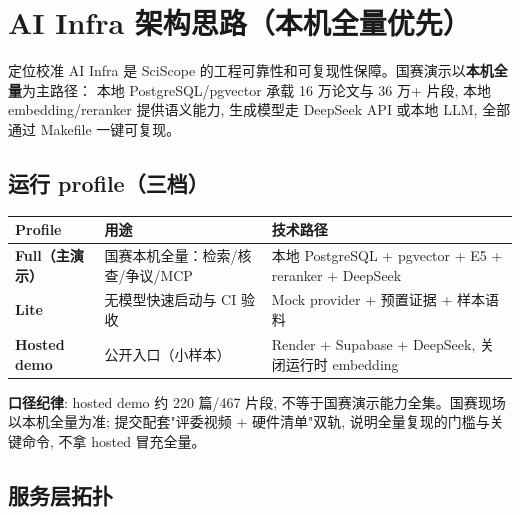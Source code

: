 \section{AI Infra 架构思路（本机全量优先）}

\begin{designbox}{定位校准}
AI Infra 是 SciScope 的工程可靠性和可复现性保障。国赛演示以\textbf{本机全量}为主路径：
本地 PostgreSQL/pgvector 承载 16 万论文与 36 万+ 片段, 本地 embedding/reranker 提供语义能力,
生成模型走 DeepSeek API 或本地 LLM, 全部通过 Makefile 一键可复现。
\end{designbox}

\subsection{运行 profile（三档）}

\begin{center}
\begin{tabularx}{\textwidth}{>{\bfseries}p{28mm}X X}
\toprule
Profile & 用途 & 技术路径 \\
\midrule
Full（主演示） & 国赛本机全量：检索/核查/争议/MCP & 本地 PostgreSQL + pgvector + E5 + reranker + DeepSeek \\
Lite & 无模型快速启动与 CI 验收 & Mock provider + 预置证据 + 样本语料 \\
Hosted demo & 公开入口（小样本） & Render + Supabase + DeepSeek, 关闭运行时 embedding \\
\bottomrule
\end{tabularx}
\end{center}

\begin{plainbox}
\textbf{口径纪律}: hosted demo 约 220 篇/467 片段, 不等于国赛演示能力全集。国赛现场以本机全量为准;
提交配套"评委视频 + 硬件清单"双轨, 说明全量复现的门槛与关键命令, 不拿 hosted 冒充全量。
\end{plainbox}

\subsection{服务层拓扑}


